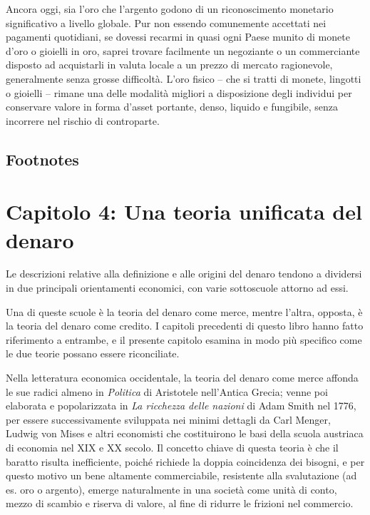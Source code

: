 \documentclass[
  a5paper,
  smalldemyvopaper,10pt,twoside,onecolumn,openright,extrafontsizes,hidelinks]{memoir}
\begin{document}
Ancora oggi, sia l'oro che l'argento godono di un riconoscimento
monetario significativo a livello globale. Pur non essendo comunemente
accettati nei pagamenti quotidiani, se dovessi recarmi in quasi ogni
Paese munito di monete d'oro o gioielli in oro, saprei trovare
facilmente un negoziante o un commerciante disposto ad acquistarli in
valuta locale a un prezzo di mercato ragionevole, generalmente senza
grosse difficoltà. L'oro fisico -- che si tratti di monete, lingotti o
gioielli -- rimane una delle modalità migliori a disposizione degli
individui per conservare valore in forma d'asset portante, denso,
liquido e fungibile, senza incorrere nel rischio di controparte.

\section{Footnotes}\label{footnotes-4}


\chapter{\texorpdfstring{Capitolo 4: \textbf{Una teoria unificata del
denaro}}{Capitolo 4: Una teoria unificata del denaro}}\label{capitolo-4-una-teoria-unificata-del-denaro}

Le descrizioni relative alla definizione e alle origini del denaro
tendono a dividersi in due principali orientamenti economici, con varie
sottoscuole attorno ad essi.

Una di queste scuole è la teoria del denaro come merce, mentre l'altra,
opposta, è la teoria del denaro come credito. I capitoli precedenti di
questo libro hanno fatto riferimento a entrambe, e il presente capitolo
esamina in modo più specifico come le due teorie possano essere
riconciliate.

Nella letteratura economica occidentale, la teoria del denaro come merce
affonda le sue radici almeno in \emph{Politica} di Aristotele
nell'Antica Grecia; venne poi elaborata e popolarizzata in \emph{La
ricchezza delle nazioni} di Adam Smith nel 1776, per essere
successivamente sviluppata nei minimi dettagli da Carl Menger, Ludwig
von Mises e altri economisti che costituirono le basi della scuola
austriaca di economia nel XIX e XX secolo. Il concetto chiave di questa
teoria è che il baratto risulta inefficiente, poiché richiede la doppia
coincidenza dei bisogni, e per questo motivo un bene altamente
commerciabile, resistente alla svalutazione (ad es. oro o argento),
emerge naturalmente in una società come unità di conto, mezzo di scambio
e riserva di valore, al fine di ridurre le frizioni nel commercio.
\end{document}

